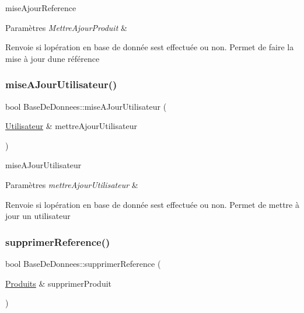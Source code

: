 mise\+Ajour\+Reference 


\begin{DoxyParams}{Paramètres}
{\em Mettre\+Ajour\+Produit} & \\
\hline
\end{DoxyParams}
\begin{DoxyReturn}{Renvoie}
si l\textquotesingle{}opération en base de donnée s\textquotesingle{}est effectuée ou non. Permet de faire la mise à jour d\textquotesingle{}une référence 
\end{DoxyReturn}
\mbox{\label{class_base_de_donnees_a9c2bce97f39046e66b3dd3d08c2b911a}} 
\subsubsection{\texorpdfstring{mise\+A\+Jour\+Utilisateur()}{miseAJourUtilisateur()}}
{\footnotesize\ttfamily bool Base\+De\+Donnees\+::mise\+A\+Jour\+Utilisateur (\begin{DoxyParamCaption}\item[{\mbox{\hyperlink{class_utilisateur}{Utilisateur}} \&}]{mettre\+Ajour\+Utilisateur }\end{DoxyParamCaption})}



mise\+A\+Jour\+Utilisateur 


\begin{DoxyParams}{Paramètres}
{\em mettre\+Ajour\+Utilisateur} & \\
\hline
\end{DoxyParams}
\begin{DoxyReturn}{Renvoie}
si l\textquotesingle{}opération en base de donnée s\textquotesingle{}est effectuée ou non. Permet de mettre à jour un utilisateur 
\end{DoxyReturn}
\mbox{\label{class_base_de_donnees_a824bea64c3ef77eff0e4334a617b36c8}} 
\subsubsection{\texorpdfstring{supprimer\+Reference()}{supprimerReference()}}
{\footnotesize\ttfamily bool Base\+De\+Donnees\+::supprimer\+Reference (\begin{DoxyParamCaption}\item[{\mbox{\hyperlink{class_produits}{Produits}} \&}]{supprimer\+Produit }\end{DoxyParamCaption})}



